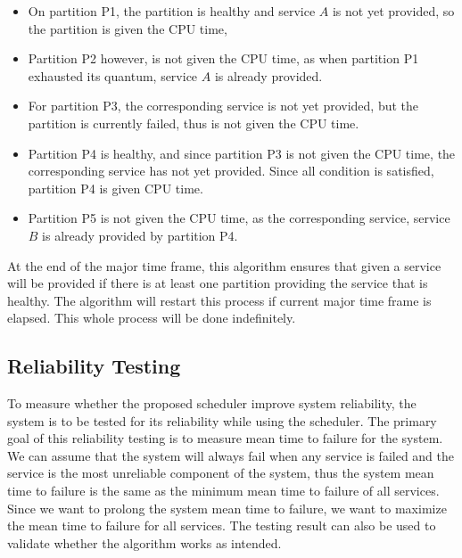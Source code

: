 \documentclass[conference]{IEEEtran}
\begin{document}
\begin{itemize}

	\item On partition P1, the partition is healthy and service $A$ is not yet provided, so
		the partition is given the CPU time,

	\item Partition P2 however, is not given the CPU time, as when partition P1 exhausted
		its quantum, service $A$ is already provided.

	\item For partition P3, the corresponding service is not yet provided, but the partition
		is currently failed, thus is not given the CPU time.

	\item Partition P4 is healthy, and since partition P3 is not given the CPU time, the
		corresponding service has not yet provided. Since all condition is satisfied,
		partition P4 is given CPU time.

	\item Partition P5 is not given the CPU time, as the corresponding service, service $B$
		is already provided by partition P4.

\end{itemize}

At the end of the major time frame, this algorithm ensures that given a service will be provided
if there is at least one partition providing the service that is healthy. The algorithm will
restart this process if current major time frame is elapsed. This whole process will be done
indefinitely.

\subsection{Reliability Testing}

To measure whether the proposed scheduler improve system reliability, the system is to be tested
for its reliability while using the scheduler. The primary goal of this reliability testing is
to measure mean time to failure for the system. We can assume that the system will always fail
when any service is failed and the service is the most unreliable component of the system, thus
the system mean time to failure is the same as the minimum mean time to failure of all services.
Since we want to prolong the system mean time to failure, we want to maximize the mean time to
failure for all services. The testing result can also be used to validate whether the algorithm
works as intended.
\end{document}
